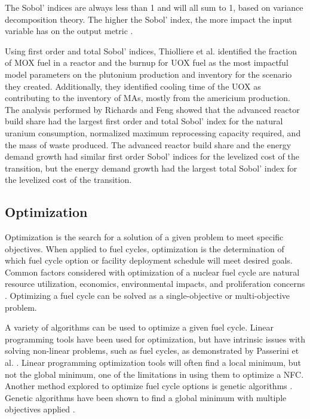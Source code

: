 \noindent The Sobol' indices are always less than 1 and will all sum to 1, 
based
on variance decomposition theory. The higher the Sobol' index, the more 
impact the input variable has on the output metric 
\cite{thiolliere_methodology_2018}.

Using first order and total Sobol' indices, Thiolliere et al.
\cite{thiolliere_methodology_2018} identified 
the fraction of \gls{MOX} fuel in a reactor 
and the burnup for \gls{UOX} fuel as the most impactful model parameters on 
the plutonium production and inventory
for the scenario they created. 
Additionally, they identified cooling time of the \gls{UOX} as contributing 
to the inventory of \glspl{MA}, mostly from the 
americium production. The analysis performed by Richards and Feng
\cite{richards_application_2021}
showed that the advanced reactor build share had the largest first 
order and total Sobol' index for the natural uranium consumption, 
normalized 
maximum reprocessing capacity required, and the mass of waste produced. The 
advanced reactor build share and the energy demand growth had similar first 
order Sobol' indices for the levelized cost of the transition, but the 
energy demand growth had the largest total Sobol' index for the levelized 
cost of the transition. 

\subsection{Optimization}
Optimization is the search for a solution of a given problem to 
meet specific objectives. When applied to fuel cycles, optimization 
is the determination of which fuel cycle option or facility 
deployment schedule will meet desired goals. Common factors 
considered with optimization of a nuclear fuel cycle are natural 
resource utilization, economics, environmental impacts, and proliferation 
concerns \cite{passerini_systematic_2014,wigeland_nuclear_2014}. Optimizing 
a fuel cycle can be solved as a single-objective or multi-objective 
problem. 

A variety of algorithms can be used to optimize a given 
fuel cycle. Linear programming tools have been used for 
optimization, but have intrinsic issues with solving non-linear 
problems, such as fuel cycles, as demonstrated by 
Passerini et al. \cite{passerini_systematic_2014}.
Linear programming optimization tools will often find a local minimum, 
but not the global minimum, one of the limitations in using them 
to optimize a \gls{NFC}.
Another method explored to optimize fuel cycle options is genetic 
algorithms \cite{passerini_systematic_2014}. Genetic algorithms 
have been shown to find a global minimum with multiple objectives 
applied \cite{passerini_systematic_2014}. 

